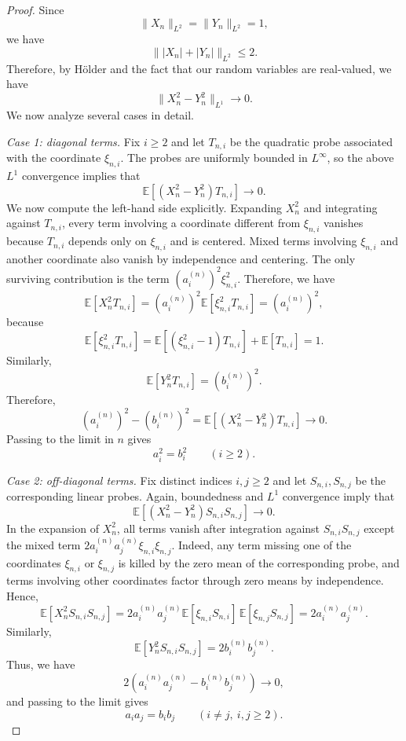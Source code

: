 \documentclass[11pt]{amsart}
\numberwithin{equation}{section}
\theoremstyle{definition}
\theoremstyle{remark}
\newcommand{\E}{\mathbb E}
\newcommand{\norm}[1]{\lVert #1 \rVert}
\begin{document}
\begin{proof}
 Since
\[
\norm{X_n}_{L^2}=\norm{Y_n}_{L^2}=1,
\]
we have
\[
\norm{|X_n|+|Y_n|}_{L^2}\le 2.
\]
Therefore, by H\"older and the fact that our random variables are real-valued, we have
\[
\norm{X_n^2-Y_n^2}_{L^1}\longrightarrow0.
\]
We now analyze several cases in detail.
 \vspace{0.5em}
 
\noindent\emph{Case 1: diagonal terms.}
Fix $i\ge2$ and let $T_{n,i}$ be the quadratic probe associated with the
coordinate $\xi_{n,i}$.  The probes are uniformly bounded in $L^\infty$, so the above
$L^1$ convergence implies that
\[
\E[(X_n^2-Y_n^2)T_{n,i}]\longrightarrow0.
\]
We now compute the left-hand side explicitly.  Expanding $X_n^2$ and integrating
against $T_{n,i}$, every term involving a coordinate different from
$\xi_{n,i}$ vanishes because $T_{n,i}$ depends only on $\xi_{n,i}$ and is
centered.  Mixed terms involving $\xi_{n,i}$ and another coordinate also
vanish by independence and centering.  The only surviving contribution is the
term $(a_i^{(n)})^2\xi_{n,i}^2$.  Therefore, we have
\[
\E[X_n^2T_{n,i}]
=(a_i^{(n)})^2\E[\xi_{n,i}^2T_{n,i}]
=(a_i^{(n)})^2,
\]
because
\[
\E[\xi_{n,i}^2T_{n,i}]
=\E[(\xi_{n,i}^2-1)T_{n,i}]+\E[T_{n,i}]
=1.
\]
Similarly,
\[
\E[Y_n^2T_{n,i}]=(b_i^{(n)})^2.
\]
Therefore,
\[
(a_i^{(n)})^2-(b_i^{(n)})^2
=\E[(X_n^2-Y_n^2)T_{n,i}]
\longrightarrow0.
\]
Passing to the limit in $n$ gives
\[
a_i^2=b_i^2
\qquad(i\ge2).
\]
\vspace{0.1em}

\noindent\emph{Case 2: off-diagonal terms.}
Fix distinct indices $i,j\ge2$ and let $S_{n,i},S_{n,j}$ be the corresponding
linear probes.  Again, boundedness and $L^1$ convergence imply that
\[
\E[(X_n^2-Y_n^2)S_{n,i}S_{n,j}]\longrightarrow0.
\]
In the expansion of $X_n^2$, all terms vanish after integration against
$S_{n,i}S_{n,j}$ except the mixed term
$2a_i^{(n)}a_j^{(n)}\xi_{n,i}\xi_{n,j}$.  Indeed, any term missing one of the
coordinates $\xi_{n,i}$ or $\xi_{n,j}$ is killed by the zero mean of the
corresponding probe, and terms involving other coordinates factor through zero
means by independence.  Hence,
\[
\E[X_n^2S_{n,i}S_{n,j}]
=2a_i^{(n)}a_j^{(n)}
\E[\xi_{n,i}S_{n,i}]\,\E[\xi_{n,j}S_{n,j}]
=2a_i^{(n)}a_j^{(n)}.
\]
Similarly,
\[
\E[Y_n^2S_{n,i}S_{n,j}]
=2b_i^{(n)}b_j^{(n)}.
\]
Thus, we have
\[
2(a_i^{(n)}a_j^{(n)}-b_i^{(n)}b_j^{(n)})\longrightarrow0,
\]
and passing to the limit gives
\[
a_ia_j=b_ib_j
\qquad(i\ne j,\ i,j\ge2).
\]
\vspace{0.1em}


\end{proof}
\end{document}
